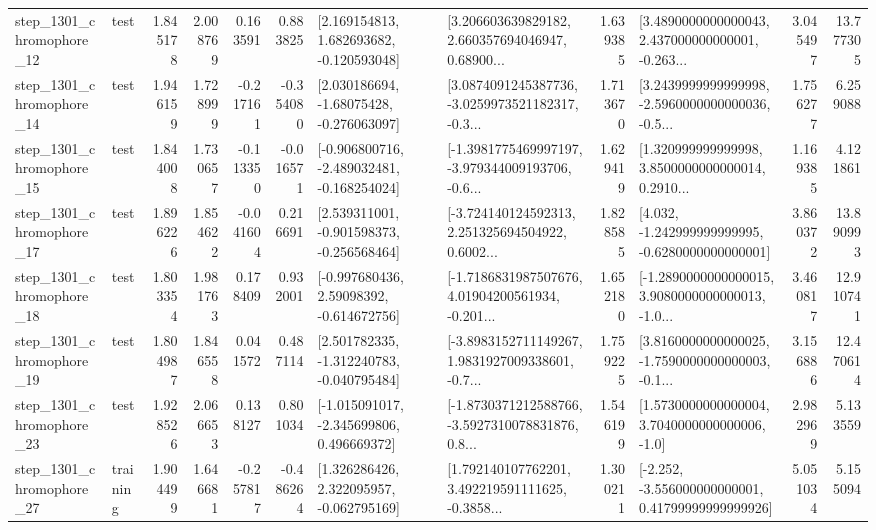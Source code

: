 \begin{tabular}{llrrrrllrlrr}
 step\_1301\_chromophore\_12 &      test &      1.845178 &    2.008769 &      0.163591 &  0.883825 &    [2.169154813, 1.682693682, -0.120593048] &  [3.206603639829182, 2.660357694046947, 0.68900... &       1.639385 &  [3.4890000000000043, 2.437000000000001, -0.263... &            3.045497 &         13.777305 \\
 step\_1301\_chromophore\_14 &      test &      1.946159 &    1.728999 &     -0.217161 & -0.354080 &    [2.030186694, -1.68075428, -0.276063097] &  [3.0874091245387736, -3.0259973521182317, -0.3... &       1.713670 &  [3.2439999999999998, -2.5960000000000036, -0.5... &            1.756277 &          6.259088 \\
 step\_1301\_chromophore\_15 &      test &      1.844008 &    1.730657 &     -0.113350 & -0.016571 &  [-0.906800716, -2.489032481, -0.168254024] &  [-1.3981775469997197, -3.979344009193706, -0.6... &       1.629419 &  [1.320999999999998, 3.8500000000000014, 0.2910... &            1.169385 &          4.121861 \\
 step\_1301\_chromophore\_17 &      test &      1.896226 &    1.854622 &     -0.041604 &  0.216691 &   [2.539311001, -0.901598373, -0.256568464] &  [-3.724140124592313, 2.251325694504922, 0.6002... &       1.828585 &   [4.032, -1.242999999999995, -0.6280000000000001] &            3.860372 &         13.890993 \\
 step\_1301\_chromophore\_18 &      test &      1.803354 &    1.981763 &      0.178409 &  0.932001 &    [-0.997680436, 2.59098392, -0.614672756] &  [-1.7186831987507676, 4.01904200561934, -0.201... &       1.652180 &  [-1.2890000000000015, 3.9080000000000013, -1.0... &            3.460817 &         12.910741 \\
 step\_1301\_chromophore\_19 &      test &      1.804987 &    1.846558 &      0.041572 &  0.487114 &   [2.501782335, -1.312240783, -0.040795484] &  [-3.8983152711149267, 1.9831927009338601, -0.7... &       1.759225 &  [3.8160000000000025, -1.7590000000000003, -0.1... &            3.156886 &         12.470614 \\
 step\_1301\_chromophore\_23 &      test &      1.928526 &    2.066653 &      0.138127 &  0.801034 &   [-1.015091017, -2.345699806, 0.496669372] &  [-1.8730371212588766, -3.5927310078831876, 0.8... &       1.546199 &     [1.5730000000000004, 3.7040000000000006, -1.0] &            2.982969 &          5.133559 \\
 step\_1301\_chromophore\_27 &  training &      1.904499 &    1.646681 &     -0.257817 & -0.486264 &    [1.326286426, 2.322095957, -0.062795169] &  [1.792140107762201, 3.492219591111625, -0.3858... &       1.300211 &  [-2.252, -3.556000000000001, 0.41799999999999926] &            5.051034 &          5.155094 \\

\end{tabular}
